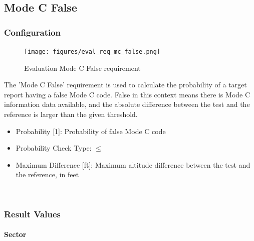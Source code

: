\subsection{Mode C False}
\label{sec:eval_req_mc_false} 

\subsubsection{Configuration}

\begin{figure}[H]
    \texttt{[image: figures/eval\_req\_mc\_false.png]}
  \caption{Evaluation Mode C False requirement}
\end{figure}

The 'Mode C False' requirement is used to calculate the probability of a target report having a false Mode C code. False in this context means there is Mode C information data available, and the absolute difference between the test and the reference is larger than the given threshold. \\

\begin{itemize}  
\item Probability [1]: Probability of false Mode C code
\item Probability Check Type: $\leq$
\item Maximum Difference [ft]: Maximum altitude difference between the test and the reference, in feet
\end{itemize}
\ \\

\subsubsection{Result Values}

\paragraph{Sector}

